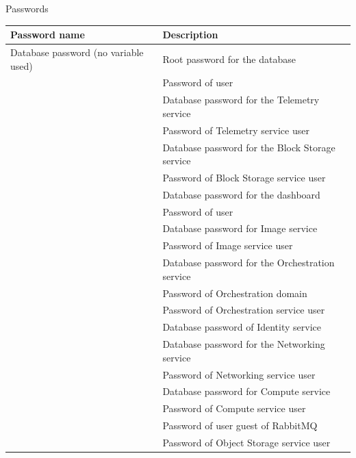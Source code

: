 \documentclass[letterpaper,10pt,english]{sphinxmanual}
\begin{document}
\begin{threeparttable}
\capstart\caption{Passwords}

\begin{tabulary}{\linewidth}{|L|L|}
\hline
\textsf{\relax 
Password name
} & \textsf{\relax 
Description
}\\
\hline
Database password (no variable used)
 & 
Root password for the database
\\
\hline
{}
 & 
Password of user 
\\
\hline
{}
 & 
Database password for the Telemetry service
\\
\hline
{}
 & 
Password of Telemetry service user 
\\
\hline
{}
 & 
Database password for the Block Storage service
\\
\hline
{}
 & 
Password of Block Storage service user 
\\
\hline
{}
 & 
Database password for the dashboard
\\
\hline
{}
 & 
Password of user 
\\
\hline
{}
 & 
Database password for Image service
\\
\hline
{}
 & 
Password of Image service user 
\\
\hline
{}
 & 
Database password for the Orchestration service
\\
\hline
{}
 & 
Password of Orchestration domain
\\
\hline
{}
 & 
Password of Orchestration service user 
\\
\hline
{}
 & 
Database password of Identity service
\\
\hline
{}
 & 
Database password for the Networking service
\\
\hline
{}
 & 
Password of Networking service user 
\\
\hline
{}
 & 
Database password for Compute service
\\
\hline
{}
 & 
Password of Compute service user 
\\
\hline
{}
 & 
Password of user guest of RabbitMQ
\\
\hline
{}
 & 
Password of Object Storage service user 
\\
\hline\end{tabulary}

\end{threeparttable}
\end{document}
